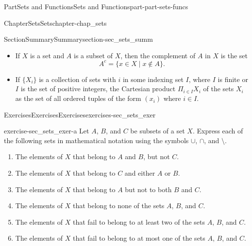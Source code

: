 \documentclass[oneside,10pt,]{book}
\numberwithin{equation}{chapter}
\begin{document}
\begin{partptx}{Part}{Sets and Functions}{}{Sets and Functions}{}{}{part-part-sets-funcs}
\begin{chapterptx}{Chapter}{Sets}{}{Sets}{}{}{chapter-chap_sets}
\begin{sectionptx}{Section}{Summary}{}{Summary}{}{}{section-sec_sets_summ}
\begin{itemize}[label=\textbullet]
\begin{equation*}
\end{equation*}
The intersection of an arbitrary collection \(\{X_{\alpha}\}\) of sets for \(\alpha\) in some indexing set \(I\) is the set%
\begin{equation*}
\bigcap_{\alpha \in I} X_{\alpha} = \{z \mid z \in X_{\beta} \text{ for all }  \beta \in I\}\text{.}
\end{equation*}
%
\item{}If \(X\) is a set and \(A\) is a subset of \(X\), then the complement of \(A\) in \(X\) is the set%
\begin{equation*}
A^c = \{x \in X \mid x \notin A\}\text{.}
\end{equation*}
%
\item{}If \(\{X_{i}\}\) is a collection of sets with \(i\) in some indexing set \(I\), where \(I\) is finite or \(I\) is the set of positive integers, the Cartesian product \(\Pi_{i \in I} X_i\) of the sets \(X_{i}\) as the set of all ordered tuples of the form \((x_i)\) where \(i \in I\).%
\end{itemize}
%
\end{sectionptx}
%
%
\typeout{************************************************}
\typeout{************************************************}
%
\begin{exercises-section}{Exercises}{Exercises}{}{Exercises}{}{}{exercises-sec_sets_exer}
\begin{divisionexercise}{1}{}{}{exercise-sec_sets_exer-a}%
Let \(A\), \(B\), and \(C\) be subsets of a set \(X\). Express each of the following sets in mathematical notation using the symbols \(\cup\), \(\cap\), and \(\setminus\).%
\begin{enumerate}[font=\bfseries,label=(\alph*),ref=\alph*]%
\item{}The elements of \(X\) that belong to \(A\) and \(B\), but not \(C\).%
\item{}The elements of \(X\) that belong to \(C\) and either \(A\) or \(B\).%
\item{}The elements of \(X\) that belong to \(A\) but not to both \(B\) and \(C\).%
\item{}The elements of \(X\) that belong to none of the sets \(A\), \(B\), and \(C\).%
\item{}The elements of \(X\) that fail to belong to at least two of the sets \(A\), \(B\), and \(C\).%
\item{}The elements of \(X\) that fail to belong to at most one of the sets \(A\), \(B\), and \(C\).%
\end{enumerate}%

\end{divisionexercise}
\end{exercises-section}
\end{chapterptx}
\end{partptx}
\end{document}
